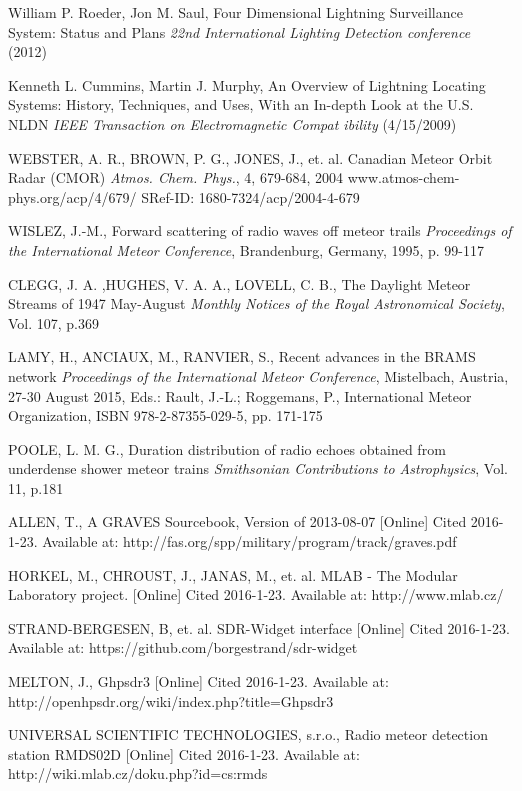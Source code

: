 \documentclass[twoside]{ctuthesis}
\theoremstyle{plain}
\theoremstyle{definition}
\theoremstyle{note}
\begin{document}
\begin{thebibliography}{99}
William P. Roeder, Jon M. Saul,
Four Dimensional Lightning Surveillance System:  Status and Plans  
\emph{22nd International Lighting Detection conference} (2012)

Kenneth L. Cummins, Martin J. Murphy,
An Overview of Lightning Locating Systems: History, Techniques, and Uses, With an In-depth Look at 
the U.S. NLDN \emph{IEEE Transaction on Electromagnetic Compat
ibility} (4/15/2009)


WEBSTER, A. R., BROWN, P. G., JONES, J., et. al.
Canadian Meteor Orbit Radar (CMOR)
\emph{Atmos. Chem. Phys.}, 4, 679-684, 2004
www.atmos-chem-phys.org/acp/4/679/
SRef-ID: 1680-7324/acp/2004-4-679

WISLEZ, J.-M.,
Forward scattering of radio waves off meteor trails
\emph{Proceedings of the International Meteor Conference}, Brandenburg, Germany, 1995, p. 99-117

CLEGG, J. A. ,HUGHES,  V. A. A., LOVELL, C. B., 
The Daylight Meteor Streams of 1947 May-August
\emph{Monthly Notices of the Royal Astronomical Society}, Vol. 107, p.369

LAMY, H., ANCIAUX, M., RANVIER, S.,
Recent advances in the BRAMS network
\emph{Proceedings of the International Meteor Conference}, Mistelbach, Austria, 27-30 August 2015, Eds.: Rault, J.-L.; Roggemans, P., International Meteor Organization, ISBN 978-2-87355-029-5, pp. 171-175

POOLE, L. M. G.,
Duration distribution of radio echoes obtained from underdense shower meteor trains
\emph{Smithsonian Contributions to Astrophysics}, Vol. 11, p.181

ALLEN, T.,
A GRAVES Sourcebook, Version of 2013-08-07
[Online] Cited 2016-1-23. Available at: http://fas.org/spp/military/program/track/graves.pdf

HORKEL, M., CHROUST, J., JANAS, M., et. al. 
MLAB - The Modular Laboratory project.
[Online] Cited 2016-1-23. Available at: http://www.mlab.cz/

STRAND-BERGESEN, B, et. al.
SDR-Widget interface
[Online] Cited 2016-1-23. Available at: https://github.com/borgestrand/sdr-widget

MELTON, J.,
Ghpsdr3
[Online] Cited 2016-1-23. Available at: http://openhpsdr.org/wiki/index.php?title=Ghpsdr3

UNIVERSAL SCIENTIFIC TECHNOLOGIES, s.r.o.,  
Radio meteor detection station RMDS02D
[Online] Cited 2016-1-23. Available at: http://wiki.mlab.cz/doku.php?id=cs:rmds


\end{thebibliography}
\end{document}
